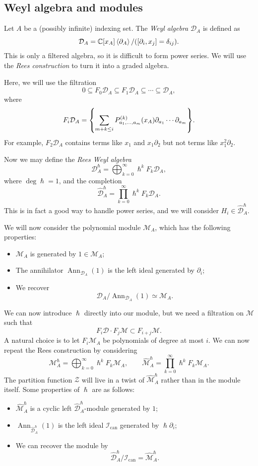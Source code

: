 \documentclass[leqno, openany]{memoir}
\theoremstyle{definition}
\theoremstyle{remark}
\theoremstyle{plain}
\theoremstyle{definition}
\theoremstyle{remark}
\newcommand{\C}{\mathbb{C}}
\newcommand{\mc}[1]{\mathcal{#1}}
\newcommand{\mr}[1]{\mathrm{#1}}
\newcommand{\on}[1]{\operatorname{#1}}
\newcommand{\wh}[1]{\widehat{#1}}
\begin{document}
\subsection{Weyl algebra and modules}

Let $A$ be a (possibly infinite) indexing set. The \textit{Weyl algebra} $\mc{D}_A$ is defined as 
\[ \mc{D}_A = \C[x_A] \ev{\partial_A} / ([\partial_i, x_j] = \delta_{ij}). \]
This is only a filtered algebra, so it is difficult to form power series. We will use the \textit{Rees construction} to turn it into a graded algebra.

Here, we will use the filtration
\[ \qty{0} \subseteq F_0 \mc{D}_A \subseteq F_1 \mc{D}_A \subseteq \cdots \subseteq \mc{D}_A, \]
where
\[ F_i \mc{D}_A = \qty{\sum_{m+k\leq i} P_{a_1, \ldots, a_m}^{(k)}(x_A) \partial_{a_1} \cdots \partial_{a_m}}. \]
For example, $F_2 \mc{D}_A$ contains terms like $x_1$ and $x_1 \partial_2$ but not terms like $x_1^2 \partial_2$.

Now we may define the \textit{Rees Weyl algebra}
\[ \mc{D}_A^{\hslash} = \bigoplus_{k=0}^{\infty} \hslash^k F_k \mc{D}_A, \]
where $\deg \hslash = 1$, and the completion
\[ \wh{\mc{D}}_A^{\hslash} = \prod_{k=0}^{\infty} \hslash^k F_k \mc{D}_A. \]
This is in fact a good way to handle power series, and we will consider $H_i \in \wh{\mc{D}}_A^{\hslash}$.

We will now consider the polynomial module $\mc{M}_A$, which has the following properties: 
\begin{itemize}
    \item $\mc{M}_A$ is generated by $1 \in \mc{M}_A$; 
    \item The annihilator $\on{Ann}_{\mc{D}_A}(1)$ is the left ideal generated by $\partial_i$; 
    \item We recover 
        \[ \mc{D}_A / \on{Ann}_{\mc{D}_A}(1) \simeq \mc{M}_A. \]
\end{itemize}
We can now introduce $\hslash$ directly into our module, but we need a filtration on $\mc{M}$ such that
\[ F_i \mc{D} \cdot F_j \mc{M} \subset F_{i+j} \mc{M}. \]
A natural choice is to let $F_i \mc{M}_A$ be polynomials of degree at most $i$. We can now repeat the Rees construction by considering
\[ \mc{M}_A^{\hslash} = \bigoplus_{k=0}^{\infty} \hslash^k F_k \mc{M}_A, \qquad \wh{\mc{M}}_A^{\hslash} = \prod_{k=0}^{\infty} \hslash^k F_k \mc{M}_A. \]
The partition function $\mc{Z}$ will live in a twist of $\wh{\mc{M}}_A^{\hslash}$ rather than in the module itself. Some properties of $\hslash$ are as follows:
\begin{itemize}
    \item $\wh{\mc{M}}_A^{\hslash}$ is a cyclic left $\wh{\mc{D}}_A^{\hslash}$-module generated by $1$;
    \item $\on{Ann}_{\wh{\mc{D}}_A^{\hslash}}(1)$ is the left ideal $\mc{I}_{\mr{can}}$ generated by $\hslash \partial_i$;
    \item We can recover the module by
        \[ \wh{\mc{D}}_A^{\hslash}/\mc{I}_{\mr{can}} = \wh{\mc{M}}_A^{\hslash}. \]
\end{itemize}
\end{document}
